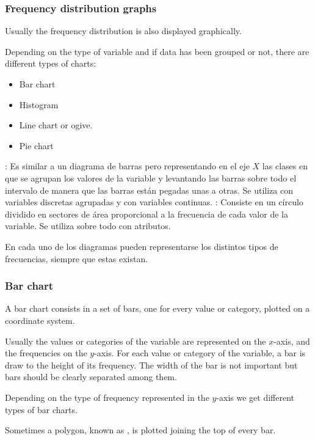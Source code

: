 \begin{frame}
\frametitle{Frequency distribution graphs}
Usually the frequency distribution is also displayed graphically.
 
Depending on the type of variable and if data has been grouped or not, there are different types of charts:
\begin{itemize}
\item Bar chart
\item Histogram
\item Line chart or ogive. 
\item Pie chart
\end{itemize}

: Es similar a un diagrama de barras pero
representando en el eje $X$ las clases en que se agrupan los valores de la variable y levantando las barras sobre todo el intervalo de manera que las barras están pegadas unas a otras.
Se utiliza con variables discretas agrupadas y con variables continuas.
: Consiste en un círculo dividido
en sectores de área proporcional a la frecuencia de cada valor de la variable.
Se utiliza sobre todo con atributos.

En cada uno de los diagramas pueden representarse los distintos tipos de frecuencias, siempre que estas existan.

\end{frame} 


\begin{frame}
\frametitle{Bar chart}
A bar chart consists in a set of bars, one for every value or category, plotted on a coordinate system. 

Usually the values or categories of the variable are represented on the $x$-axis, and the frequencies on the $y$-axis. 
For each value or category of the variable, a bar is draw to the height of its frequency.
The width of the bar is not important but bars should be clearly separated among them. 

Depending on the type of frequency represented in the $y$-axis we get different types of bar charts.
 
Sometimes a polygon, known as , is plotted joining the top of every bar.
\end{frame}



